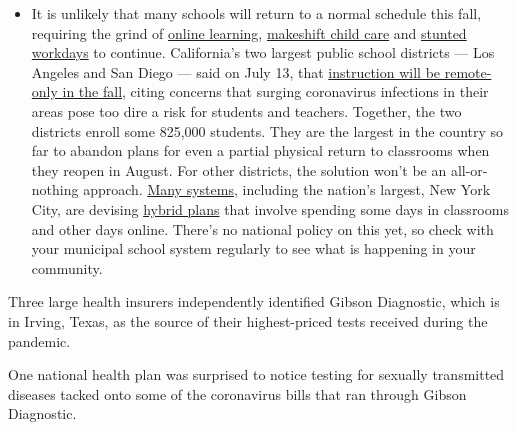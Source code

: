 \begin{itemize}
  \begin{itemize}
  \tightlist
  \item
    It is unlikely that many schools will return to a normal schedule
    this fall, requiring the grind of
    \href{https://www.nytimes.com/2020/06/05/us/coronavirus-education-lost-learning.html?action=click\&pgtype=Article\&state=default\&region=MAIN_CONTENT_3\&context=storylines_faq}{online
    learning},
    \href{https://www.nytimes.com/2020/05/29/us/coronavirus-child-care-centers.html?action=click\&pgtype=Article\&state=default\&region=MAIN_CONTENT_3\&context=storylines_faq}{makeshift
    child care} and
    \href{https://www.nytimes.com/2020/06/03/business/economy/coronavirus-working-women.html?action=click\&pgtype=Article\&state=default\&region=MAIN_CONTENT_3\&context=storylines_faq}{stunted
    workdays} to continue. California's two largest public school
    districts --- Los Angeles and San Diego --- said on July 13, that
    \href{https://www.nytimes.com/2020/07/13/us/lausd-san-diego-school-reopening.html?action=click\&pgtype=Article\&state=default\&region=MAIN_CONTENT_3\&context=storylines_faq}{instruction
    will be remote-only in the fall}, citing concerns that surging
    coronavirus infections in their areas pose too dire a risk for
    students and teachers. Together, the two districts enroll some
    825,000 students. They are the largest in the country so far to
    abandon plans for even a partial physical return to classrooms when
    they reopen in August. For other districts, the solution won't be an
    all-or-nothing approach.
    \href{https://bioethics.jhu.edu/research-and-outreach/projects/eschool-initiative/school-policy-tracker/}{Many
    systems}, including the nation's largest, New York City, are
    devising
    \href{https://www.nytimes.com/2020/06/26/us/coronavirus-schools-reopen-fall.html?action=click\&pgtype=Article\&state=default\&region=MAIN_CONTENT_3\&context=storylines_faq}{hybrid
    plans} that involve spending some days in classrooms and other days
    online. There's no national policy on this yet, so check with your
    municipal school system regularly to see what is happening in your
    community.
  \end{itemize}
\end{itemize}

Three large health insurers independently identified Gibson Diagnostic,
which is in Irving, Texas, as the source of their highest-priced tests
received during the pandemic.

One national health plan was surprised to notice testing for sexually
transmitted diseases tacked onto some of the coronavirus bills that ran
through Gibson Diagnostic.

